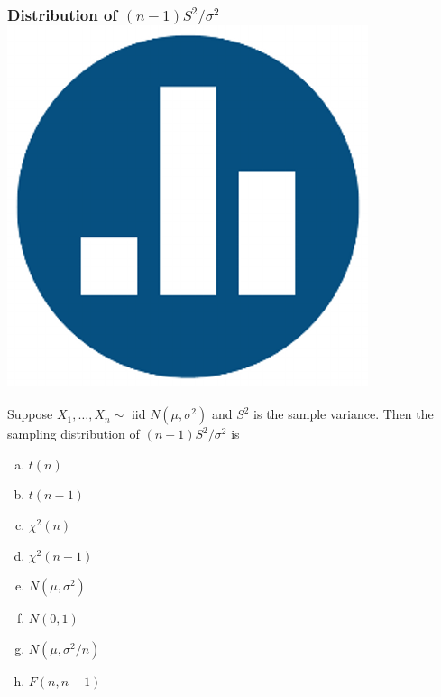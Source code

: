 \documentclass[handout]{beamer}
\begin{document}
\begin{frame}[c]\frametitle{Distribution of $(n-1)S^2/\sigma^2$ \hfill \includegraphics[scale = 0.05]{./images/clicker}}
    
    Suppose $X_1, \hdots, X_n \sim \mbox{ iid } N(\mu, \sigma^2)$ and $S^2$ is the sample variance. Then the sampling distribution of \alert{$(n-1)S^2/\sigma^2$} is

    \begin{enumerate}[(a)]
    	\item $t(n)$
    	\item $t(n-1)$
    	\item $\chi^2(n)$
    	\item $\chi^2(n-1)$
    	\item $N(\mu, \sigma^2)$
    	\item $N(0,1)$
    	\item $N(\mu, \sigma^2/n)$
    	\item $F(n, n-1)$
    \end{enumerate}


\end{frame}
\end{document}
